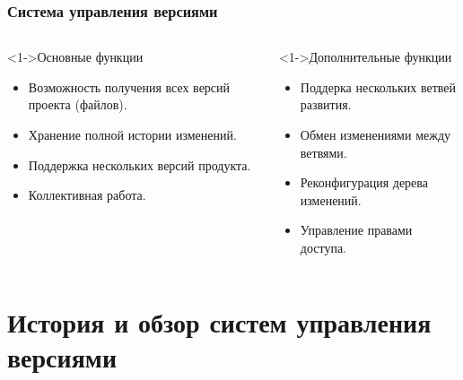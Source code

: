 \documentclass[pdf,9pt,aspectratio=169,xcolor={dvipsnames}]{beamer}
\begin{document}
\begin{frame}\frametitle{Система управления версиями}
  \begin{columns}[T]
    \begin{column}[]{0.45\textwidth}  
      \begin{block}<1->{Основные функции}
        \begin{itemize}
          \item Возможность получения всех версий проекта (файлов).
          \item Хранение полной истории изменений.
          \item Поддержка нескольких версий продукта.
          \item Коллективная работа.
        \end{itemize}
      \end{block}
    \end{column}
    \begin{column}[]{0.45\textwidth}  
      \begin{block}<1->{Дополнительные функции}
        \begin{itemize}
          \item Поддерка нескольких ветвей развития.
          \item Обмен изменениями между ветвями.
          \item Реконфигурация дерева изменений.
          \item Управление правами доступа.
        \end{itemize}
      \end{block}
    \end{column}
  \end{columns}
\end{frame}

\section{История и обзор систем управления версиями}
\end{document}

